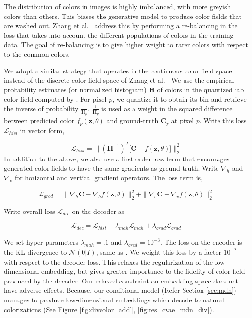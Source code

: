 \documentclass[10pt,twocolumn,letterpaper]{article}
\begin{document}
 The distribution of colors in images is highly imbalanced, with more 
greyish colors than others. This biases the generative model to produce color fields that
are washed out. Zhang et al.~\cite{ZhangColorful} address this by performing a re-balancing in the loss that 
takes into account the different populations of colors in the training data.
The goal of re-balancing is to give higher weight to rarer colors with respect
to the common colors. 

We adopt a similar strategy that operates in the continuous color field space instead of 
the discrete color field space of Zhang et al. \cite{ZhangColorful}. We use the  
empirical probability estimates (or normalized histogram) $\mathbf{H}$ of colors in the 
quantized `ab' color field computed by \cite{ZhangColorful}. For pixel $p$, we quantize it 
to obtain its bin and retrieve the inverse of probability $\frac{1}{\mathbf{H}_p}$. $\frac{1}{\mathbf{H}_p}$ 
is used as a weight in the squared difference between predicted color $f_{p}(\mathbf{z}, \theta)$ and 
ground-truth $\mathbf{C}_p$ at pixel $p$. Write this loss $\mathcal{L}_{hist}$ in vector form, 

\begin{equation}
\label{eq:vae_loss_hist}
\mathcal{L}_{hist} = \| ({\mathbf{H}^{-1}})^{T} \lbrack \mathbf{C} - f(\mathbf{z}, \theta) \rbrack \|^{2}_{2}
\end{equation} In addition to the above, we also use a first order loss term that encourages generated 
color fields to have the same gradients as ground truth. Write $\nabla_{h}$ and $\nabla_{v}$
for horizontal and vertical gradient operators. The loss term is,

\begin{equation}
\label{eq:vae_loss_grad}
\mathcal{L}_{grad} = \| \nabla_{h} \mathbf{C} - \nabla_{h} f(\mathbf{z}, \theta) \|^{2}_{2} + \| \nabla_{v} \mathbf{C} - \nabla_{v} f(\mathbf{z}, \theta) \|^{2}_{2}
\end{equation}

Write overall loss $\mathcal{L}_{dec}$ on the decoder as

\begin{equation}
\label{eq:vae_loss_all}
\mathcal{L}_{dec} = \mathcal{L}_{hist} + \lambda_{mah} \mathcal{L}_{mah} + \lambda_{grad} \mathcal{L}_{grad}
\end{equation}

We set hyper-parameters $\lambda_{mah} = .1$ and $\lambda_{grad} = 10^{-3}$. 
The loss on the encoder is the KL-divergence to $\mathcal{N}(0|I)$, same as \cite{AEB}. We
weight this loss by a factor $10^{-2}$ with respect to the decoder loss. This 
relaxes the regularization of the low-dimensional embedding, but gives
greater importance to the fidelity of color field produced by the decoder. 
Our relaxed constraint on embedding space does not have adverse effects.
Because, our conditional model (Refer Section \ref{sec:mdn}) manages to produce 
low-dimensional embeddings which decode to natural colorizations 
(See Figure \ref{fig:divcolor_addl}, \ref{fig:res_cvae_mdn_div}).
\end{document}
